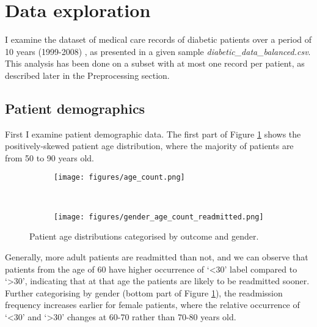 \documentclass[10pt, twocolumn]{article}
\begin{document}
\thispagestyle{first}
\pagestyle{plain}


\section{Data exploration}

I examine the dataset of medical care records of diabetic patients over a period of 10 years (1999-2008) \cite{strack2014dataset}, as presented in a given sample \textit{diabetic\_data\_balanced.csv}. This analysis has been done on a subset with at most one record per patient, as described later in the Preprocessing section.

\subsection{Patient demographics}

First I examine patient demographic data. The first part of Figure \ref{genderagecountreadmitted} shows the positively-skewed patient age distribution, where the majority of patients are from 50 to 90 years old.

\begin{figure}[htb!]
	\centering
	\begin{subfigure}[t]{0.5\textwidth}
        \centering
        \texttt{[image: figures/age\_count.png]}
	\end{subfigure}
	~
	\begin{subfigure}[t]{0.5\textwidth}
        \centering
		\texttt{[image: figures/gender\_age\_count\_readmitted.png]}
    \end{subfigure}
	\caption{Patient age distributions categorised by outcome and gender.}\label{genderagecountreadmitted}
\end{figure}

Generally, more adult patients are readmitted than not, and we can observe that patients from the age of 60 have higher occurrence of `<30' label compared to `>30', indicating that at that age the patients are likely to be readmitted sooner. Further categorising by gender (bottom part of Figure \ref{genderagecountreadmitted}), the readmission frequency increases earlier for female patients, where the relative occurrence of `<30' and `>30' changes at 60-70 rather than 70-80 years old.
\end{document}
